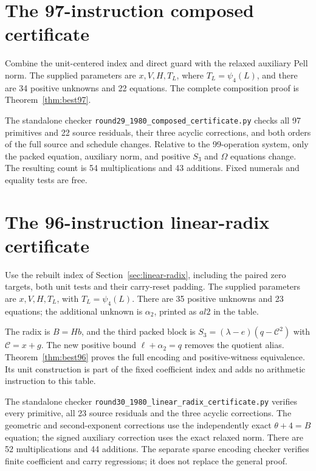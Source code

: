 \documentclass[11pt,letterpaper]{article}
\theoremstyle{definition}
\theoremstyle{remark}
\numberwithin{equation}{section}
\newcommand{\file}[1]{\texttt{#1}}
\begin{document}
\clearpage\normalsize
\section{The 97-instruction composed certificate}\label{app:97}

Combine the unit-centered index and direct guard with the relaxed
auxiliary Pell norm. The supplied parameters are $x,V,H,T_L$, where
$T_L=\psi_4(L)$, and there are 34 positive unknowns and 22 equations.
The complete composition proof is Theorem~\ref{thm:best97}.

The standalone checker \file{round29\_1980\_composed\_certificate.py}
checks all 97 primitives and 22 source residuals, their three acyclic
corrections, and both orders of the full source and schedule changes.
Relative to the 99-operation system, only the packed equation, auxiliary
norm, and positive $S_3$ and $\Omega$ equations change. The resulting
count is 54 multiplications and 43 additions. Fixed numerals and equality
tests are free.

\small


\clearpage\normalsize
\section{The 96-instruction linear-radix certificate}\label{app:96}

Use the rebuilt index of Section~\ref{sec:linear-radix}, including the
paired zero targets, both unit tests and their carry-reset padding.
The supplied parameters are $x,V,H,T_L$, with $T_L=\psi_4(L)$.
There are 35 positive unknowns and 23 equations; the additional unknown
is $\alpha_2$, printed as $\mathit{al2}$ in the table.

The radix is $B=Hb$, and the third packed block is
$S_3=(\lambda-e)(q-\mathcal C^2)$ with $\mathcal C=x+g$.
The new positive bound $\ell+\alpha_2=q$ removes the quotient alias.
Theorem~\ref{thm:best96} proves the full encoding and positive-witness
equivalence. Its unit construction is part of the fixed coefficient
index and adds no arithmetic instruction to this table.

The standalone checker \file{round30\_1980\_linear\_radix\_certificate.py}
verifies every primitive, all 23 source residuals and the three acyclic
corrections. The geometric and second-exponent corrections use the
independently exact $\theta+4=B$ equation; the signed auxiliary correction
uses the exact relaxed norm. There are 52 multiplications and 44 additions.
The separate sparse encoding checker verifies finite coefficient and
carry regressions; it does not replace the general proof.
\end{document}
